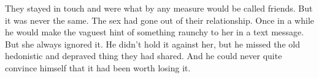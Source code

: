 \documentclass[letterpaper]{article}
\begin{document}
They stayed in touch and were what by any measure would be called friends.
But it was never the same. The sex had gone out of their relationship.
Once in a while he would make the vaguest hint of something raunchy to her in a text message.
But she always ignored it. He didn't hold it against her, but he missed the old hedonistic and depraved thing they had shared. And he could never quite convince himself that it had been worth losing it.






\end{document}
